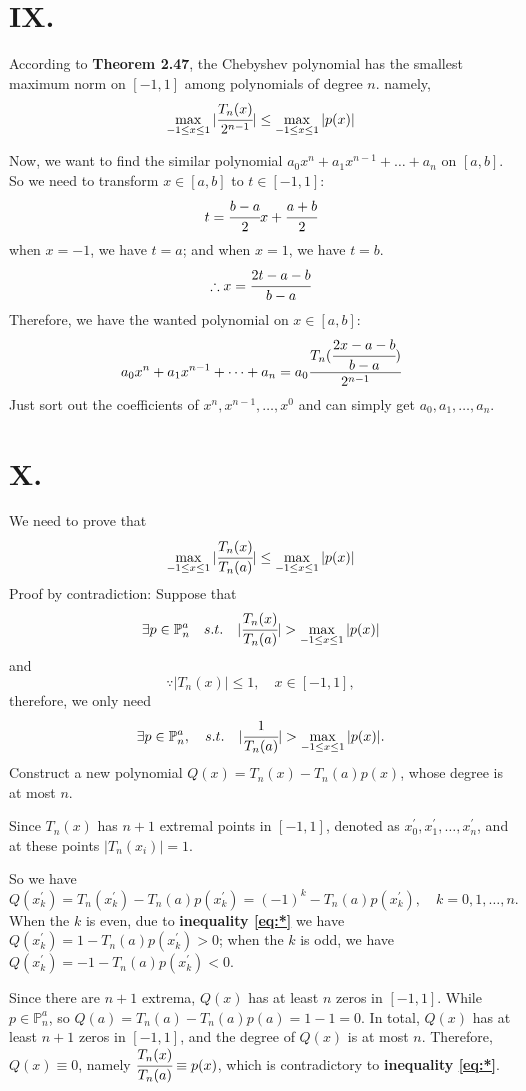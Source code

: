 \documentclass[a4paper]{article}
\begin{document}
\section*{IX. }
According to \textbf{Theorem 2.47}, the Chebyshev polynomial has the smallest maximum norm on $[-1,1]$ among polynomials of degree $n$.
namely,
\[
\max_{-1 \leq x \leq 1}|\cfrac{T_n(x)}{2^{n-1}}| \leq \max_{-1 \leq x \leq 1}|p(x)|
\]

Now, we want to find the similar polynomial $a_0x^n + a_1x^{n-1} + \dots + a_n$ on $[a,b]$.
So we need to transform $x \in [a,b]$ to $t \in [-1,1]$: 
\[
t = \cfrac{b-a}{2}x + \cfrac{a+b}{2}
\]
when $x = -1$, we have $t = a$; and when $x = 1$, we have $t = b$.
\[
\therefore x = \cfrac{2t-a-b}{b-a}
\]
Therefore, we have the wanted polynomial on $x \in [a,b]$:
\[
a_0x^n + a_1x^{n-1} + \dots + a_n = a_0 \cfrac{T_n(\cfrac{2x-a-b}{b-a})}{2^{n-1}}
\]
Just sort out the coefficients of $x^n, x^{n-1}, \dots, x^0$ and can simply get $a_0, a_1, \dots, a_n$.

\section*{X. }
We need to prove that
\[
\max_{-1 \leq x \leq 1}|\cfrac{T_n(x)}{T_n(a)}| \leq \max_{-1 \leq x \leq 1}|p(x)|
\]
Proof by contradiction: Suppose that
\[
\exists p \in \mathbb{P}^{a}_n\quad s.t. \quad |\cfrac{T_n(x)}{T_n(a)}| > \max_{-1 \leq x \leq 1}|p(x)|
\]
and 
\[
\because |T_n(x)| \leq 1, \quad x \in [-1,1],
\]
therefore, we only need 
\begin{equation}
  \label{eq:*}
  \exists p \in \mathbb{P}^{a}_n,\quad s.t. \quad |\cfrac{1}{T_n(a)}| > \max_{-1 \leq x \leq 1}|p(x)|.
\end{equation}
Construct a new polynomial $Q(x) = T_n(x) - T_n(a)p(x)$, whose degree is at most $n$.

Since $T_n(x)$ has $n+1$ extremal points in $[-1,1]$, denoted as $x^{'}_0, x^{'}_1, \dots, x^{'}_n$, and at these points $|T_n(x_i)| = 1$.

So we have 
\[
Q(x^{'}_k) = T_n(x^{'}_k) - T_n(a)p(x^{'}_k) = (-1)^k - T_n(a)p(x^{'}_k), \quad k = 0,1,\dots,n.
\]
When the $k$ is even, due to \textbf{inequality \ref{eq:*}} we have $Q(x^{'}_k) = 1 - T_n(a)p(x^{'}_k) > 0$; when the $k$ is odd, we have $Q(x^{'}_k) = -1 - T_n(a)p(x^{'}_k) < 0$.

Since there are $n+1$ extrema, $Q(x)$ has at least $n$ zeros in $[-1,1]$.
While $p \in \mathbb{P}^{a}_n$, so $Q(a) = T_n(a) - T_n(a)p(a) = 1-1 = 0$.
In total, $Q(x)$ has at least $n+1$ zeros in $[-1,1]$, and the degree of $Q(x)$ is at most $n$.
Therefore, $Q(x) \equiv 0$, namely $\cfrac{T_n(x)}{T_n(a)} \equiv p(x)$, which is contradictory to \textbf{inequality \ref{eq:*}}.
\end{document}
